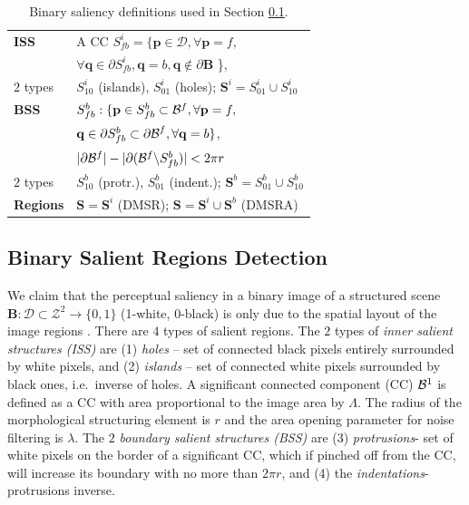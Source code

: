\documentclass{article}
\def\B{{\mathbf B}}
\def\mcD{{\mathcal{D}}}
\def\p{{\mathbf p}}
\def\q{{\mathbf q}}
\def\S{{\mathbf S}}
\begin{document}
\begin{table}[hbt]
\begin{minipage}[b]{0.99\linewidth}\begin{tabular}{|l l|}
\hline
{\bf ISS} & A CC $S^i_{fb} = \{\p \in \mcD, \forall \p=f,$\\&$\forall \q \in \partial S^i_{fb}, \q=b, \q \notin \partial \B $ \},\\
$2$ types & $S^i_{10}$ (islands), $S^i_{01}$  (holes); $\S^i = S_{01}^i \cup S_{10}^i$\\
{\bf BSS} &  $S_{fb}^b: \{\p \in S_{fb}^b \subset{\cal B}^f, \forall \p = f,$\\&$ \q \in \partial S_{fb}^b \subset {\partial \cal B}^f,\forall \q = b \}$, \\
& $|\partial {\cal B}^f| - |\partial ({\cal B}^f \backslash S_{fb}^b)| < 2 \pi r$\\
$2$ types & $S^b_{10}$ (protr.), $S^b_{01}$ (indent.); $\S^b = S_{01}^b \cup S_{10}^b$\\
{\bf Regions} &  $\S = \S^i$ (DMSR); $\S = \S^i \cup \S^b$ (DMSRA)  \\
\hline
\end{tabular}
\hfill
\centering
\caption{Binary saliency definitions used in Section \ref{ssec:binary}.}\label{table:binary_sal}
\end{minipage}
\vspace*{-0.4cm}
\end{table}


\subsection{Binary Salient Regions Detection}
\label{ssec:binary}
We claim that the perceptual saliency in a binary image of a structured scene 
 $\B: \mcD \subset \mathcal{Z}^2 \rightarrow \{0,1\}$ (1-white, 0-black)
is only due to the spatial layout of the image regions \cite{RangHumpb06}. 
There are  $4$ types of salient regions. The $2$ types of {\em inner salient structures (ISS)} are (1) {\em holes} -- set of connected black pixels entirely surrounded by white pixels, and (2) {\em islands} -- set of connected white pixels surrounded by black ones, i.e.~inverse of holes. A significant connected component (CC) ${\cal B}^1$ is defined as a CC with area proportional to the image area by $\Lambda$. The radius of the morphological structuring element is $r$ and  the area opening parameter for  noise filtering is $\lambda$. The $2$ {\em boundary salient structures (BSS)} are (3) {\em protrusions}- set of white pixels on the border of a significant CC, which if pinched off from the CC, will increase its boundary with no more than $2\pi r$, and (4) the {\em indentations}- protrusions inverse. 
\end{document}
